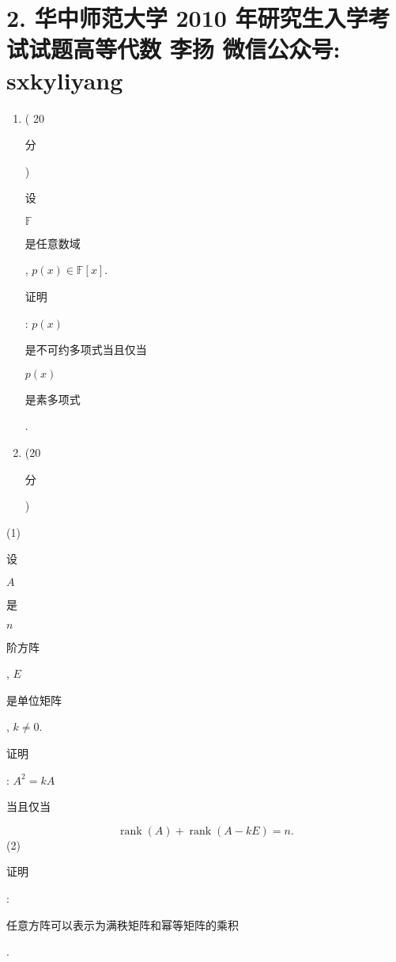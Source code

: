 \documentclass[10pt]{article}
\begin{document}
\section{2. 华中师范大学 2010 年研究生入学考试试题高等代数 
 李扬 
 微信公众号: sxkyliyang}
\begin{enumerate}
  \item ( 20 \begin{CJK}{UTF8}{mj}分\end{CJK}) \begin{CJK}{UTF8}{mj}设\end{CJK} $\mathbb{F}$ \begin{CJK}{UTF8}{mj}是任意数域\end{CJK}, $p(x) \in \mathbb{F}[x]$. \begin{CJK}{UTF8}{mj}证明\end{CJK}: $p(x)$ \begin{CJK}{UTF8}{mj}是不可约多项式当且仅当\end{CJK} $p(x)$ \begin{CJK}{UTF8}{mj}是素多项式\end{CJK}.

  \item (20 \begin{CJK}{UTF8}{mj}分\end{CJK})

\end{enumerate}
(1) \begin{CJK}{UTF8}{mj}设\end{CJK} $A$ \begin{CJK}{UTF8}{mj}是\end{CJK} $n$ \begin{CJK}{UTF8}{mj}阶方阵\end{CJK}, $E$ \begin{CJK}{UTF8}{mj}是单位矩阵\end{CJK}, $k \neq 0$. \begin{CJK}{UTF8}{mj}证明\end{CJK}: $A^{2}=k A$ \begin{CJK}{UTF8}{mj}当且仅当\end{CJK}
$$
\operatorname{rank}(A)+\operatorname{rank}(A-k E)=n .
$$
(2) \begin{CJK}{UTF8}{mj}证明\end{CJK}: \begin{CJK}{UTF8}{mj}任意方阵可以表示为满秩矩阵和幂等矩阵的乘积\end{CJK}.
\end{document}
